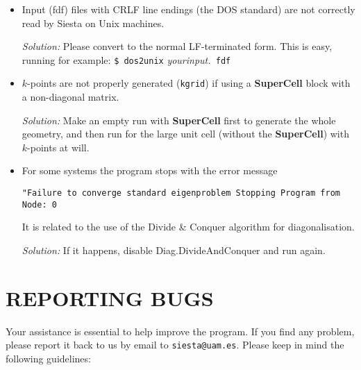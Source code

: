 \documentclass[11pt]{article}
\begin{document}
\begin{itemize}

\item
Input (fdf) files with CRLF line endings (the DOS standard) are not
correctly read by {\sc Siesta} on Unix machines.

{\it Solution:} Please convert to the normal LF-terminated form. This
is easy, running for example: {\tt \$ dos2unix} {\it yourinput.}{\tt
fdf}

\item
$k$-points are not properly generated ({\tt kgrid}) if using a
{\bf SuperCell} block with a non-diagonal matrix.

{\it Solution:} Make an empty run with {\bf SuperCell} first to generate
the whole geometry, and then run for the large unit cell (without the
{\bf SuperCell}) with $k$-points at will.

\item
For some systems the program stops with the error message

{\tt "Failure to converge standard eigenproblem
Stopping Program from Node:    0}

It is related to the use of the Divide \& Conquer algorithm for
diagonalisation.

{\it Solution:} If it happens, disable Diag.DivideAndConquer and run again.

\end{itemize}

\section{REPORTING BUGS}
 Your assistance is essential to help improve the
program. If you find any problem, please report it back to us by email
to {\tt siesta@uam.es}. Please keep in mind the following guidelines:
\end{document}
